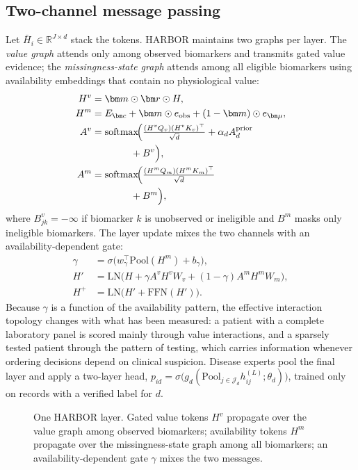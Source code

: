 \subsection{Two-channel message passing}
Let $\bar H_i\in\mathbb{R}^{J\times d}$ stack the tokens. HARBOR maintains two graphs per layer. The \emph{value graph} attends only among observed biomarkers and transmits gated value evidence; the \emph{missingness-state graph} attends among all eligible biomarkers using availability embeddings that contain no physiological value:
\begin{align}
H^{v}&=\bm m\odot\bm r\odot H,\\
H^{m}&=E_{\bm c}+\bm m\odot e_{\mathrm{obs}}+(1-\bm m)\odot e_{\bm\mu},\\
A^{v}&=\mathrm{softmax}\!\Big(\tfrac{(H^{v}Q_v)(H^{v}K_v)^{\top}}{\sqrt d}+\alpha_dA^{\mathrm{prior}}_d\notag\\
&\qquad\qquad+B^{v}\Big),\label{eq:attn}\\
A^{m}&=\mathrm{softmax}\!\Big(\tfrac{(H^{m}Q_m)(H^{m}K_m)^{\top}}{\sqrt d}\notag\\
&\qquad\qquad+B^{m}\Big),
\end{align}
where $B^{v}_{jk}=-\infty$ if biomarker $k$ is unobserved or ineligible and $B^{m}$ masks only ineligible biomarkers. The layer update mixes the two channels with an availability-dependent gate:
\begin{equation}\label{eq:twochannel}
\begin{aligned}
\gamma&=\sigma\!\big(w_\gamma^{\top}\mathrm{Pool}(H^{m})+b_\gamma\big),\\
H'&=\mathrm{LN}\!\big(H+\gamma A^{v}H^{v}W_v+(1-\gamma)A^{m}H^{m}W_m\big),\\
H^{+}&=\mathrm{LN}\!\big(H'+\mathrm{FFN}(H')\big).
\end{aligned}
\end{equation}
Because $\gamma$ is a function of the availability pattern, the effective interaction topology changes with what has been measured: a patient with a complete laboratory panel is scored mainly through value interactions, and a sparsely tested patient through the pattern of testing, which carries information whenever ordering decisions depend on clinical suspicion. Disease experts pool the final layer and apply a two-layer head, $p_{id}=\sigma\big(g_d(\mathrm{Pool}_{j\in\mathcal{J}_d}h^{(L)}_{ij};\theta_d)\big)$, trained only on records with a verified label for $d$.

\begin{figure}[!t]
\centering
\resizebox{0.92\textwidth}{!}{}
\caption{One HARBOR layer. Gated value tokens $H^{v}$ propagate over the value graph among observed biomarkers; availability tokens $H^{m}$ propagate over the missingness-state graph among all biomarkers; an availability-dependent gate $\gamma$ mixes the two messages.}
\label{fig:harbor}
\end{figure}


